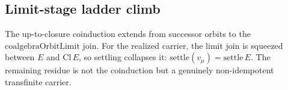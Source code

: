\subsection{Limit-stage ladder climb}

\begin{theorem}\label{thm:transfinite-ladder-climb}\leanok{}
The up-to-closure coinduction extends from successor orbits to the
\(\mathrm{coalgebraOrbitLimit}\) join.  For the realized carrier, the limit join
is squeezed between \(E\) and \(\mathrm{Cl}\,E\), so settling collapses it:
\(\mathrm{settle}(v_\mu)=\mathrm{settle}\,E\).  The remaining residue is not the
coinduction but a genuinely non-idempotent transfinite carrier.
\end{theorem}
